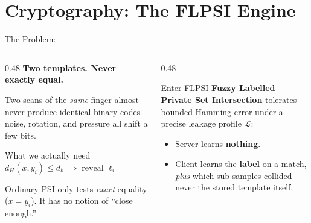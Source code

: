 \documentclass{beamer}
\begin{document}
\section{Cryptography: The FLPSI Engine}

\begin{frame}{The Problem: }
  \begin{columns}[T, onlytextwidth]
    \begin{column}{0.48\textwidth}
      \textbf{Two templates. Never exactly equal.}
      \vspace{4pt}
      
      Two scans of the \emph{same} finger almost never produce identical
      binary codes - noise, rotation, and pressure all shift a few bits.
      
      \vspace{8pt}
      \begin{block}{\small What we actually need}
      \centering
      \small
      $d_H(x, y_i) \le d_k \;\Rightarrow\; \text{reveal } \ell_i$
      \end{block}
      
      \vspace{6pt}
      \small Ordinary PSI only tests \emph{exact} equality ($x = y_i$).
      It has no notion of ``close enough.''
    \end{column}
    \hfill
    \begin{column}{0.48\textwidth}
      \begin{block}{\small Enter FLPSI}
      \small
      \textbf{Fuzzy Labelled Private Set Intersection} tolerates bounded
      Hamming error under a precise leakage profile $\mathcal{L}$:
      \begin{itemize}
        \small
        \item Server learns \textbf{nothing}.
        \item Client learns the \textbf{label} on a match, \emph{plus} which
        sub-samples collided - never the stored template itself.
      \end{itemize}
      \end{block}
      \vspace{6pt}
      
    \end{column}
  \end{columns}
\end{frame}
\end{document}
